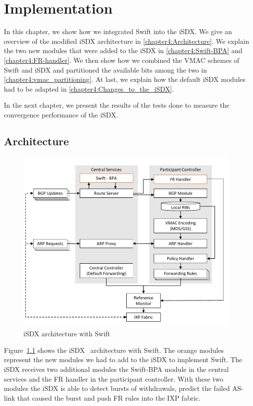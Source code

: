 \chapter{\label{chapter4}Implementation}

In this chapter, we show how we integrated Swift into the iSDX. We give an overview of the modified iSDX architecture in \ref{chapter4:Architecture}. We explain the two new modules that were added to the iSDX in \ref{chapter4:Swift-BPA} and  \ref{chapter4:FR-handler}. We then show how we combined the VMAC schemes of Swift and iSDX and partitioned the available bits among the two in \ref{chapter4:vmac_partitioning}. At last, we explain how the default iSDX modules had to be adapted in \ref{chapter4:Changes_to_the_iSDX}.

In the next chapter, we present the results of the tests done to measure the convergence performance of the iSDX.

\section{\label{chapter4:Architecture}Architecture}

\begin{figure}[h]
\center
\includegraphics[scale = 0.5]{Figures/design_sdx_swift_cropped.pdf}
\caption{iSDX architecture with Swift}
\label{fig:isdx_architecture_with_swift}
\end{figure}

Figure~\ref{fig:isdx_architecture_with_swift} shows the iSDX~\cite{feamster2013sdx} architecture with Swift. The orange modules represent the new modules we had to add to the iSDX to implement Swift. The iSDX receives two additional modules the Swift-BPA module in the central services and the FR handler in the participant controller. With these two modules the iSDX is able to detect bursts of withdrawals, predict the failed AS-link that caused the burst and push FR rules into the IXP fabric.

